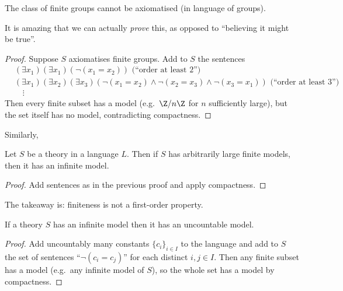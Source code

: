 \documentclass[a4paper]{article}
\begin{document}
\begin{corollary}
  The class of finite groups cannot be axiomatised (in language of groups).
\end{corollary}

\begin{remark}
  It is amazing that we can actually \emph{prove} this, as opposed to ``believing it might be true''.
\end{remark}

\begin{proof}
  Suppose \(S\) axiomatises finite groups. Add to \(S\) the sentences
  \begin{align*}
    & (\exists x_1) (\exists x_1) (\neg(x_1 = x_2)) \text{ (``order at least 2'')} \\
    & (\exists x_1) (\exists x_2) (\exists x_3) (\neg(x_1 = x_2) \land \neg(x_2 = x_3) \land \neg(x_3 = x_1)) \text{ (``order at least 3'')} \\
    & \quad \vdots
  \end{align*}
  Then every finite subset has a model (e.g.\ \(\Z/n\Z\) for \(n\) sufficiently large), but the set itself has no model, contradicting compactness.
\end{proof}

Similarly,

\begin{corollary}
  Let \(S\) be a theory in a language \(L\). Then if \(S\) has arbitrarily large finite models, then it has an infinite model.
\end{corollary}

\begin{proof}
  Add sentences as in the previous proof and apply compactness.
\end{proof}

The takeaway is: finiteness is not a first-order property.

\begin{corollary}
  If a theory \(S\) has an infinite model then it has an uncountable model.
\end{corollary}

\begin{proof}
  Add uncountably many constants \(\{c_i\}_{i \in I}\) to the language and add to \(S\) the set of sentences ``\(\neg(c_i = c_j)\)'' for each distinct \(i, j \in I\). Then any finite subset has a model (e.g.\ any infinite model of \(S\)), so the whole set has a model by compactness.
\end{proof}
\end{document}
